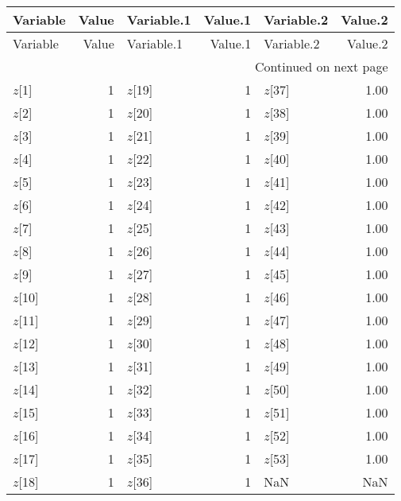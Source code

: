\begin{longtable}{lrlrlr}
\toprule
Variable & Value & Variable.1 & Value.1 & Variable.2 & Value.2 \\
\midrule
\endfirsthead
\toprule
Variable & Value & Variable.1 & Value.1 & Variable.2 & Value.2 \\
\midrule
\endhead
\midrule
\multicolumn{6}{r}{Continued on next page} \\
\midrule
\endfoot
\bottomrule
\endlastfoot
$z$[1] & 1 & $z$[19] & 1 & $z$[37] & 1.00 \\
$z$[2] & 1 & $z$[20] & 1 & $z$[38] & 1.00 \\
$z$[3] & 1 & $z$[21] & 1 & $z$[39] & 1.00 \\
$z$[4] & 1 & $z$[22] & 1 & $z$[40] & 1.00 \\
$z$[5] & 1 & $z$[23] & 1 & $z$[41] & 1.00 \\
$z$[6] & 1 & $z$[24] & 1 & $z$[42] & 1.00 \\
$z$[7] & 1 & $z$[25] & 1 & $z$[43] & 1.00 \\
$z$[8] & 1 & $z$[26] & 1 & $z$[44] & 1.00 \\
$z$[9] & 1 & $z$[27] & 1 & $z$[45] & 1.00 \\
$z$[10] & 1 & $z$[28] & 1 & $z$[46] & 1.00 \\
$z$[11] & 1 & $z$[29] & 1 & $z$[47] & 1.00 \\
$z$[12] & 1 & $z$[30] & 1 & $z$[48] & 1.00 \\
$z$[13] & 1 & $z$[31] & 1 & $z$[49] & 1.00 \\
$z$[14] & 1 & $z$[32] & 1 & $z$[50] & 1.00 \\
$z$[15] & 1 & $z$[33] & 1 & $z$[51] & 1.00 \\
$z$[16] & 1 & $z$[34] & 1 & $z$[52] & 1.00 \\
$z$[17] & 1 & $z$[35] & 1 & $z$[53] & 1.00 \\
$z$[18] & 1 & $z$[36] & 1 & NaN & NaN \\
\end{longtable}
